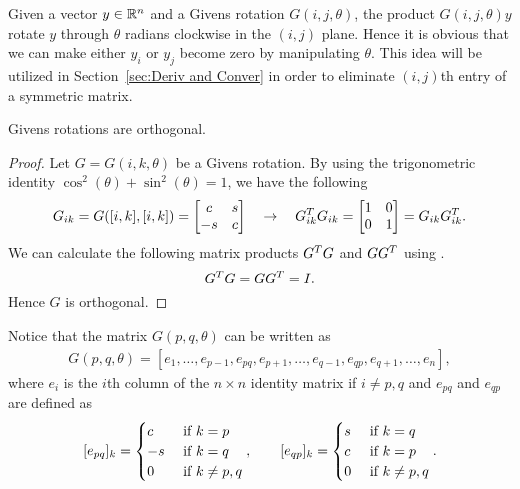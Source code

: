 Given a vector $y\in\mathbb{R}^n$ and a Givens rotation $G(i,j,\theta)$, the product $G(i,j,\theta) y$ rotate $y$ through $\theta$ radians clockwise in the $(i,j)$ plane. Hence it is obvious that we can make either $y_i$ or $y_j$ become zero by manipulating $\theta$. This idea will be utilized in Section~\ref{sec:Deriv and Conver} in order to eliminate $(i,j)$th entry of a symmetric matrix.

\begin{proposition}
  Givens rotations are orthogonal.
\end{proposition}
\begin{proof}
  Let $G = G(i,k,\theta)$ be a Givens rotation. By using the trigonometric identity $\cos^2(\theta) + \sin^2(\theta) = 1$, we have the following 
  \begin{equation}\label{eq:1.2}
      G_{ik}=G([i,k],[i,k]) = 
      \begin{bmatrix}
          c & s \\
          -s & c 
      \end{bmatrix}
      \quad \to \quad 
      G_{ik}^T G_{ik} = 
      \begin{bmatrix}
          1 & 0 \\
          0 & 1
      \end{bmatrix}
      = G_{ik}G_{ik}^T .
  \end{equation}
  We can calculate the following matrix products $G^T G$ and $GG^T$ using .
  \begin{equation}\notag
      G^T G = GG^T = I.
  \end{equation}
  Hence $G$ is orthogonal.
\end{proof}

Notice that the matrix $G(p,q,\theta)$ can be written as
\begin{equation}\label{eq:1.4}
  \begin{aligned}
      G(p,q,\theta) = [e_1,\dots,e_{p-1},e_{pq},e_{p+1},\dots,e_{q-1},e_{qp},e_{q+1},\dots,e_{n}],
  \end{aligned}
\end{equation}
where $e_i$ is the $i$th column of the $n\times n$ identity matrix if $i\neq p,q$ and $e_{pq}$ and $e_{qp}$ are defined as 
\begin{equation}\label{eq:1.5}
  [e_{pq}]_k = \begin{cases}
      c & \text{ if } k = p \\
      -s & \text{ if } k = q\\
      0 & \text{ if } k \neq p,q
  \end{cases}, \qquad 
  [e_{qp}]_k = \begin{cases}
      s & \text{ if } k = q \\
      c & \text{ if } k = p\\
      0 & \text{ if } k \neq p,q
  \end{cases}.
\end{equation}

